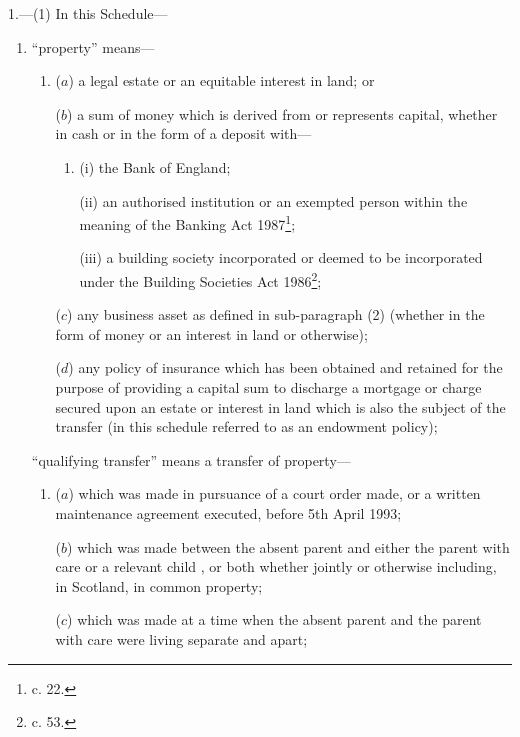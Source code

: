 \documentclass[12pt,a4paper]{article}
\begin{document}
1.—(1) In this Schedule—
\begin{enumerate}\item[]
“property” means—
\begin{enumerate}\item[]
($a$) a legal estate or an equitable interest in land; or

($b$) a sum of money which is derived from or represents capital, whether in cash or in the form of a deposit with—
\begin{enumerate}\item[]
(i) the Bank of England;

(ii) an authorised institution or an exempted person within the meaning of the Banking Act 1987\footnote{ c. 22.};

(iii) a building society incorporated or deemed to be incorporated under the Building Societies Act 1986\footnote{ c. 53.};
\end{enumerate}

\begin{sloppypar}
($c$) any business asset as defined in sub-paragraph (2) (whether in the form of money or an interest in land or otherwise);
\end{sloppypar}

($d$) any policy of insurance which has been obtained and retained for the purpose of providing a capital sum to discharge a mortgage or charge secured upon an estate or interest in land which is also the subject of the transfer (in this schedule referred to as an endowment policy);
\end{enumerate}

“qualifying transfer” means a transfer of property—
\begin{enumerate}\item[]
($a$) which was made in pursuance of a court order made, or a written maintenance agreement executed, before 5th April 1993;

($b$) which was made between the absent parent and either the parent with care or a relevant child%
, or both whether jointly or otherwise including, in Scotland, in common property;  %

($c$) which was made at a time when the absent parent and the parent with care were living separate and apart;



\end{enumerate}
\end{enumerate}
\end{document}

